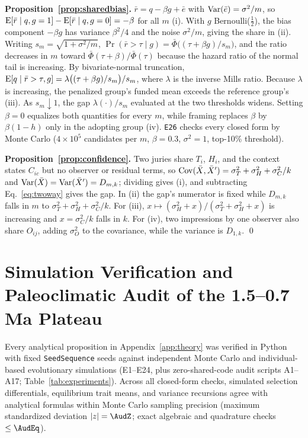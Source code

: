 \noindent\textbf{Proposition~\ref{prop:sharedbias}.} $\bar r=q-\beta g+\bar e$ with $\operatorname{Var}(\bar e)=\sigma^2/m$, so $\operatorname{E}[\bar r\mid q,g=1]-\operatorname{E}[\bar r\mid q,g=0]=-\beta$ for all $m$ (i). With $g$ Bernoulli($\tfrac12$), the bias component $-\beta g$ has variance $\beta^2/4$ and the noise $\sigma^2/m$, giving the share in (ii). Writing $s_m=\sqrt{1+\sigma^2/m}$, $\Pr(\bar r>\tau\mid g)=\bar\Phi\big((\tau+\beta g)/s_m\big)$, and the ratio decreases in $m$ toward $\bar\Phi(\tau+\beta)/\bar\Phi(\tau)$ because the hazard ratio of the normal tail is increasing. By bivariate-normal truncation, $\operatorname{E}[q\mid\bar r>\tau,g]=\lambda\big((\tau+\beta g)/s_m\big)/s_m$, where $\lambda$ is the inverse Mills ratio. Because $\lambda$ is increasing, the penalized group's funded mean exceeds the reference group's (iii). As $s_m\downarrow 1$, the gap $\lambda(\cdot)/s_m$ evaluated at the two thresholds widens. Setting $\beta=0$ equalizes both quantities for every $m$, while framing replaces $\beta$ by $\beta(1-h)$ only in the adopting group (iv). \texttt{E26} checks every closed form by Monte Carlo ($4\times10^5$ candidates per $m$, $\beta=0.3$, $\sigma^2=1$, top-10\% threshold).

\noindent\textbf{Proposition~\ref{prop:confidence}.} Two juries share $T_i$, $H_i$, and the context states $C_{ic}$ but no observer or residual terms, so $\operatorname{Cov}(\bar X,\bar X')=\sigma_T^2+\sigma_H^2+\sigma_C^2/k$ and $\operatorname{Var}(\bar X)=\operatorname{Var}(\bar X')=D_{m,k}$; dividing gives (i), and subtracting Eq.~\eqref{eq:twoway} gives the gap. In (ii) the gap's numerator is fixed while $D_{m,k}$ falls in $m$ to $\sigma_T^2+\sigma_H^2+\sigma_C^2/k$. For (iii), $x\mapsto(\sigma_H^2+x)/(\sigma_T^2+\sigma_H^2+x)$ is increasing and $x=\sigma_C^2/k$ falls in $k$. For (iv), two impressions by one observer also share $O_{ij}$, adding $\sigma_O^2$ to the covariance, while the variance is $D_{1,k}$. \qed

\setcounter{table}{0}
\renewcommand{\thetable}{B\arabic{table}}
\renewcommand{\theHtable}{AppB.tab.\arabic{table}}

\section{Simulation Verification and Paleoclimatic Audit of the \texorpdfstring{1.5--0.7\,Ma}{1.5-0.7 Ma} Plateau}\label{app:paleo}

Every analytical proposition in Appendix~\ref{app:theory} was verified in Python with fixed \texttt{SeedSequence} seeds against independent Monte Carlo and individual-based evolutionary simulations (E1--E24, plus zero-shared-code audit scripts A1--A17; Table~\ref{tab:experiments}). Across all closed-form checks, simulated selection differentials, equilibrium trait means, and variance recursions agree with analytical formulas within Monte Carlo sampling precision (maximum standardized deviation $|z|=\AudZ$; exact algebraic and quadrature checks $\le\AudEq$).

